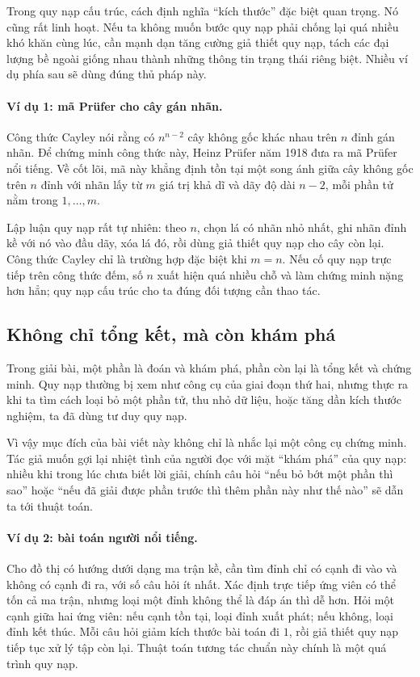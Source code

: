 \documentclass[11pt]{article}
\begin{document}
Trong quy nạp cấu trúc, cách định nghĩa ``kích thước'' đặc biệt quan trọng.
Nó cũng rất linh hoạt. Nếu ta không muốn bước quy nạp phải chống lại quá nhiều
khó khăn cùng lúc, cần mạnh dạn tăng cường giả thiết quy nạp, tách các đại
lượng bề ngoài giống nhau thành những thông tin trạng thái riêng biệt. Nhiều
ví dụ phía sau sẽ dùng đúng thủ pháp này.

\paragraph{Ví dụ 1: mã Prüfer cho cây gán nhãn.}
Công thức Cayley nói rằng có \(n^{n-2}\) cây không gốc khác nhau trên \(n\)
đỉnh gán nhãn. Để chứng minh công thức này, Heinz Prüfer năm 1918 đưa ra mã
Prüfer nổi tiếng. Về cốt lõi, mã này khẳng định tồn tại một song ánh giữa cây
không gốc trên \(n\) đỉnh với nhãn lấy từ \(m\) giá trị khả dĩ và dãy độ dài
\(n-2\), mỗi phần tử nằm trong \(1,\ldots,m\).

Lập luận quy nạp rất tự nhiên: theo \(n\), chọn lá có nhãn nhỏ nhất, ghi nhãn
đỉnh kề với nó vào đầu dãy, xóa lá đó, rồi dùng giả thiết quy nạp cho cây còn
lại. Công thức Cayley chỉ là trường hợp đặc biệt khi \(m=n\). Nếu cố quy nạp
trực tiếp trên công thức đếm, số \(n\) xuất hiện quá nhiều chỗ và làm chứng
minh nặng hơn hẳn; quy nạp cấu trúc cho ta đúng đối tượng cần thao tác.

\subsection{Không chỉ tổng kết, mà còn khám phá}

Trong giải bài, một phần là đoán và khám phá, phần còn lại là tổng kết và
chứng minh. Quy nạp thường bị xem như công cụ của giai đoạn thứ hai, nhưng
thực ra khi ta tìm cách loại bỏ một phần tử, thu nhỏ dữ liệu, hoặc tăng dần
kích thước nghiệm, ta đã dùng tư duy quy nạp.

Vì vậy mục đích của bài viết này không chỉ là nhắc lại một công cụ chứng
minh. Tác giả muốn gợi lại nhiệt tình của người đọc với mặt ``khám phá'' của
quy nạp: nhiều khi trong lúc chưa biết lời giải, chính câu hỏi ``nếu bỏ bớt
một phần thì sao'' hoặc ``nếu đã giải được phần trước thì thêm phần này như
thế nào'' sẽ dẫn ta tới thuật toán.

\paragraph{Ví dụ 2: bài toán người nổi tiếng.}
Cho đồ thị có hướng dưới dạng ma trận kề, cần tìm đỉnh chỉ có cạnh đi vào và
không có cạnh đi ra, với số câu hỏi ít nhất. Xác định trực tiếp ứng viên có
thể tốn cả ma trận, nhưng loại một đỉnh không thể là đáp án thì dễ hơn. Hỏi
một cạnh giữa hai ứng viên: nếu cạnh tồn tại, loại đỉnh xuất phát; nếu không,
loại đỉnh kết thúc. Mỗi câu hỏi giảm kích thước bài toán đi \(1\), rồi giả
thiết quy nạp tiếp tục xử lý tập còn lại. Thuật toán tương tác chuẩn này chính
là một quá trình quy nạp.
\end{document}
